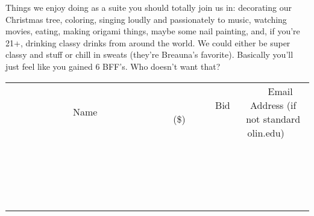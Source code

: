 \documentclass[11pt]{article}
\begin{document}
Things we enjoy doing as a suite you should totally join us in: decorating our Christmas tree, coloring, singing loudly and passionately to music, watching movies, eating, making origami things, maybe some nail painting, and, if you're 21+, drinking classy drinks from around the world. We could either be super classy and stuff or chill in sweats (they're Breauna's favorite). Basically you'll just feel like you gained 6 BFF's. Who doesn't want that?
\\[3ex]
\begin{tabular}{c c c}
~~~~~~~~~~~~~Name~~~~~~~~~~~~~ & ~~~~~~~~~Bid (\$)~~~~~~~~~  & ~~~Email Address (if not standard olin.edu)~~~\\
 & & \\
\hline
 & & \\
\hline
 & & \\
\hline
 & & \\
\hline
 & & \\
\hline
 & & \\
\hline
 & & \\
\hline
 & & \\
\hline
 & & \\
\hline
 & & \\
\hline
 & & \\
\hline
 & & \\
\hline
 & & \\
\hline
 & & \\
\hline
 & & \\
\hline
 & & \\
\hline
 & & \\
\hline
 & & \\
\hline
 & & \\
\hline
\end{tabular}
\newpage
\end{document}
